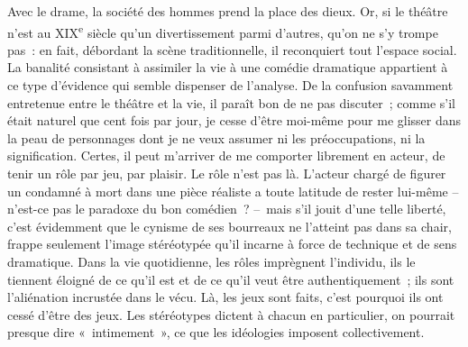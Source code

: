 \documentclass[french,twoside]{book} %
\newcommand{\astermono}{\medskip\centerline{\color{rubric}\large\selectfont{\syms ✻}}\medskip\par}%
\begin{document}
Avec le drame, la société des hommes prend la place des dieux. Or, si le théâtre n’est au XIX\textsuperscript{e} siècle qu’un divertissement parmi d’autres, qu’on ne s’y trompe pas : en fait, débordant la scène traditionnelle, il reconquiert tout l’espace social. La banalité consistant à assimiler la vie à une comédie dramatique appartient à ce type d’évidence qui semble dispenser de l’analyse. De la confusion savamment entretenue entre le théâtre et la vie, il paraît bon de ne pas discuter ; comme s’il était naturel que cent fois par jour, je cesse d’être moi-même pour me glisser dans la peau de personnages dont je ne veux assumer ni les préoccupations, ni la signification. Certes, il peut m’arriver de me comporter librement en acteur, de tenir un rôle par jeu, par plaisir. Le rôle n’est pas là. L’acteur chargé de figurer un condamné à mort dans une pièce réaliste a toute latitude de rester lui-même – n’est-ce pas le paradoxe du bon comédien ? – mais s’il jouit d’une telle liberté, c’est évidemment que le cynisme de ses bourreaux ne l’atteint pas dans sa chair, frappe seulement l’image stéréotypée qu’il incarne à force de technique et de sens dramatique. Dans la vie quotidienne, les rôles imprègnent l’individu, ils le tiennent éloigné de ce qu’il est et de ce qu’il veut être authentiquement ; ils sont l’aliénation incrustée dans le vécu. Là, les jeux sont faits, c’est pourquoi ils ont cessé d’être des jeux. Les stéréotypes dictent à chacun en particulier, on pourrait presque dire « intimement », ce que les idéologies imposent collectivement.\par

\astermono
\end{document}
